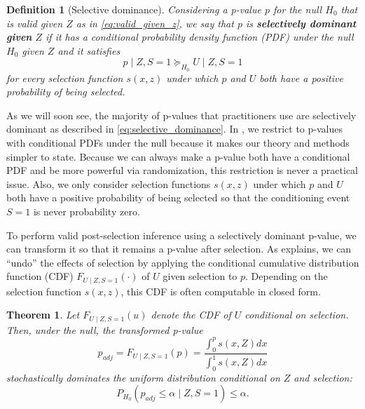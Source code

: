 \documentclass{article}
\newtheorem{definition}{Definition}
\newtheorem{theorem}{Theorem}
\begin{document}
\begin{definition}[Selective dominance]
    \label{def:selective_dominance}
    Considering a p-value $p$ for the null $H_0$ that is valid given $Z$ as in \eqref{eq:valid_given_z}, we say that $p$ is \textbf{selectively dominant given } $Z$ if it has a conditional probability density function (PDF) under the null $H_0$ given $Z$ and it satisfies 
    \begin{equation}
    \label{eq:selective_dominance}
    p \mid Z, S = 1 \succeq_{H_0} U \mid Z, S = 1
    \end{equation}
    for every selection function $s(x, z)$ under which $p$ and $U$ both have a positive probability of being selected. 
\end{definition}

As we will soon see, the majority of p-values that practitioners use are selectively dominant as described in \eqref{eq:selective_dominance}. In , we restrict to p-values with conditional PDFs under the null because it makes our theory and methods simpler to state. Because we can always make a p-value both have a conditional PDF and be more powerful via randomization, this restriction is never a practical issue. Also, we only consider selection functions $s(x, z)$ under which $p$ and $U$ both have a positive probability of being selected so that the conditioning event $S = 1$ is never probability zero. 

To perform valid post-selection inference using a selectively dominant p-value, we can transform it so that it remains a p-value after selection. As  explains, we can ``undo'' the effects of selection by applying the conditional cumulative distribution function (CDF) $F_{U \mid Z, S = 1}(\cdot)$ of $U$ given selection to $p$. Depending on the selection function $s(x, z)$, this CDF is often computable in closed form. 

\begin{theorem}
    \label{thm:adjustment}
    Let  $F_{U \mid Z, S = 1}(u)$ denote the CDF of $U$ conditional on selection. Then, under the null, the transformed p-value
    \begin{equation}
    \label{eq:adjustment}
        p_{adj} = F_{U \mid Z, S = 1}(p) = \frac{\int_0^p s(x, Z) dx}{\int_0^1 s(x, Z) dx}
    \end{equation}
    stochastically dominates the uniform distribution conditional on $Z$ and selection:
    \begin{equation}
    \label{eq:selective_error_control}
        P_{H_0}(p_{adj} \leq \alpha \mid Z, S= 1) \leq \alpha. 
    \end{equation}
\end{theorem}
\end{document}
